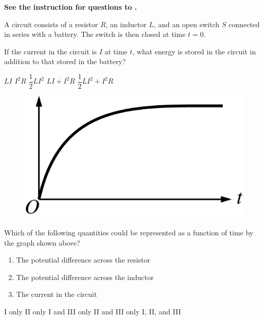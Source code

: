 \textbf{See the instruction for questions  to .}

A circuit consists of a resistor $R$, an inductor $L$, and an open switch $S$ connected in series with a battery. The switch is then closed at time $t=0$.

\begin{questions}\setcounter{question}{28}\question
If the current in the circuit is $I$ at time $t$, what energy is stored in the circuit in addition to that stored in the battery?

\begin{oneparchoices}
\choice $L I$
\choice $I^{2} R$
\choice $\dfrac{1}{2} L I^{2}$
\choice $L I+I^{2} R$
\choice $\dfrac{1}{2} L I^{2}+I^{2} R$
\end{oneparchoices}\end{questions}

\begin{figure}[H]
    \center
    \includegraphics[scale=0.25]{images/img-011-021.png}
\end{figure}

\begin{questions}\setcounter{question}{29}\question
Which of the following quantities could be represented as a function of time by the graph shown above?
\begin{enumerate}
    \item The potential difference across the resistor
    \item The potential difference across the inductor
    \item The current in the circuit
\end{enumerate}

\begin{oneparchoices}
\choice I only
\choice II only
\choice I and III only
\choice II and III only
\choice I, II, and III
\end{oneparchoices}\end{questions}

